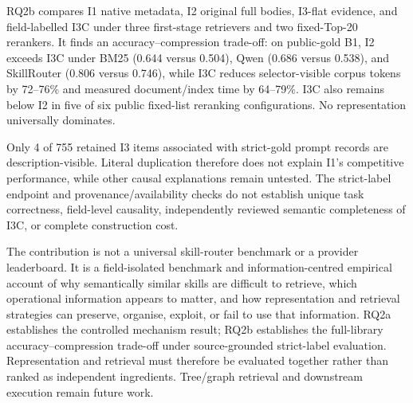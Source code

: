 RQ2b compares I1 native metadata, I2 original full bodies, I3-flat evidence, and field-labelled I3C under three first-stage retrievers and two fixed-Top-20 rerankers. It finds an accuracy--compression trade-off: on public-gold B1, I2 exceeds I3C under BM25 (0.644 versus 0.504), Qwen (0.686 versus 0.538), and SkillRouter (0.806 versus 0.746), while I3C reduces selector-visible corpus tokens by 72--76\% and measured document/index time by 64--79\%. I3C also remains below I2 in five of six public fixed-list reranking configurations. No representation universally dominates.

Only 4 of 755 retained I3 items associated with strict-gold prompt records are description-visible. Literal duplication therefore does not explain I1's competitive performance, while other causal explanations remain untested. The strict-label endpoint and provenance/availability checks do not establish unique task correctness, field-level causality, independently reviewed semantic completeness of I3C, or complete construction cost.

The contribution is not a universal skill-router benchmark or a provider leaderboard. It is a field-isolated benchmark and information-centred empirical account of why semantically similar skills are difficult to retrieve, which operational information appears to matter, and how representation and retrieval strategies can preserve, organise, exploit, or fail to use that information. RQ2a establishes the controlled mechanism result; RQ2b establishes the full-library accuracy--compression trade-off under source-grounded strict-label evaluation. Representation and retrieval must therefore be evaluated together rather than ranked as independent ingredients. Tree/graph retrieval and downstream execution remain future work.
